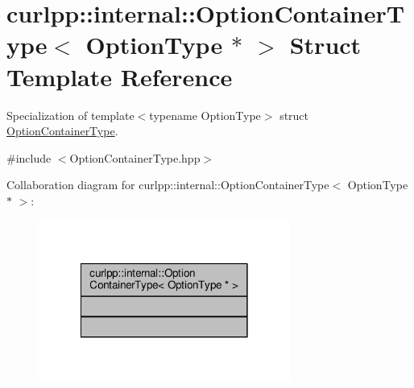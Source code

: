 \hypertarget{structcurlpp_1_1internal_1_1OptionContainerType_3_01OptionType_01_5_01_4}{\section{curlpp\-:\-:internal\-:\-:Option\-Container\-Type$<$ Option\-Type $\ast$ $>$ Struct Template Reference}
\label{structcurlpp_1_1internal_1_1OptionContainerType_3_01OptionType_01_5_01_4}
}


Specialization of template$<$typename Option\-Type$>$ struct \hyperlink{structcurlpp_1_1internal_1_1OptionContainerType}{Option\-Container\-Type}.  




{\ttfamily \#include $<$Option\-Container\-Type.\-hpp$>$}



Collaboration diagram for curlpp\-:\-:internal\-:\-:Option\-Container\-Type$<$ Option\-Type $\ast$ $>$\-:
\nopagebreak
\begin{figure}[H]
\begin{center}
\leavevmode
\includegraphics[width=234pt]{structcurlpp_1_1internal_1_1OptionContainerType_3_01OptionType_01_5_01_4__coll__graph}
\end{center}
\end{figure}
